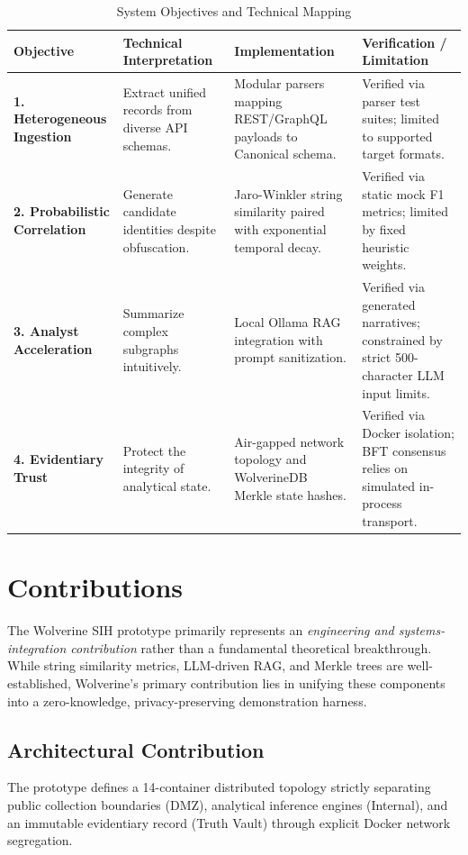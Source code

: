 \begin{table}[h]
\centering
\begin{tabular}{p{} p{} p{} p{}}
\toprule
\textbf{Objective} & \textbf{Technical Interpretation} & \textbf{Implementation} & \textbf{Verification / Limitation} \\
\midrule
\textbf{1. Heterogeneous Ingestion} & Extract unified records from diverse API schemas. & Modular parsers mapping REST/GraphQL payloads to Canonical schema. & Verified via parser test suites; limited to supported target formats. \\
\addlinespace
\textbf{2. Probabilistic Correlation} & Generate candidate identities despite obfuscation. & Jaro-Winkler string similarity paired with exponential temporal decay. & Verified via static mock F1 metrics; limited by fixed heuristic weights. \\
\addlinespace
\textbf{3. Analyst Acceleration} & Summarize complex subgraphs intuitively. & Local Ollama RAG integration with prompt sanitization. & Verified via generated narratives; constrained by strict 500-character LLM input limits. \\
\addlinespace
\textbf{4. Evidentiary Trust} & Protect the integrity of analytical state. & Air-gapped network topology and WolverineDB Merkle state hashes. & Verified via Docker isolation; BFT consensus relies on simulated in-process transport. \\
\bottomrule
\end{tabular}
\caption{System Objectives and Technical Mapping}
\label{tab:objectives}
\end{table}

\section{Contributions}
\label{sec:intro-contributions}
The Wolverine SIH prototype primarily represents an \textit{engineering and systems-integration contribution} rather than a fundamental theoretical breakthrough. While string similarity metrics, LLM-driven RAG, and Merkle trees are well-established, Wolverine's primary contribution lies in unifying these components into a zero-knowledge, privacy-preserving demonstration harness.

\subsection{Architectural Contribution}
The prototype defines a 14-container distributed topology strictly separating public collection boundaries (DMZ), analytical inference engines (Internal), and an immutable evidentiary record (Truth Vault) through explicit Docker network segregation.

